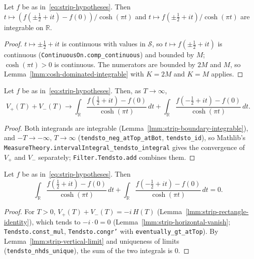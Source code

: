 \begin{lemma}
    \label{lmm:strip-boundary-integrable}
    \leanok
    Let $f$ be as in~\eqref{eq:strip-hypotheses}. Then $t \mapsto (f(\pm\tfrac{1}{2} + it) - f(0))/\cosh(\pi t)$ and $t \mapsto f(\pm\tfrac{1}{2} + it)/\cosh(\pi t)$ are integrable on $\mathbb{R}$.
\end{lemma}
\begin{proof}
    \leanok
    $t \mapsto \pm\tfrac{1}{2} + it$ is continuous with values in $\mathcal{S}$, so $t \mapsto f(\pm\tfrac{1}{2} + it)$ is continuous (\texttt{ContinuousOn.comp\_continuous}) and bounded by $M$; $\cosh(\pi t) > 0$ is continuous. The numerators are bounded by $2M$ and $M$, so Lemma~\ref{lmm:cosh-dominated-integrable} with $K = 2M$ and $K = M$ applies.
\end{proof}

\begin{lemma}
    \label{lmm:strip-vertical-limit}
    \leanok
    Let $f$ be as in~\eqref{eq:strip-hypotheses}. Then, as $T \to \infty$,
    \[ V_+(T) + V_-(T) \to \int_{\mathbb{R}} \frac{f(\tfrac{1}{2} + it) - f(0)}{\cosh(\pi t)} \, dt + \int_{\mathbb{R}} \frac{f(-\tfrac{1}{2} + it) - f(0)}{\cosh(\pi t)} \, dt. \]
\end{lemma}
\begin{proof}
    \leanok
    Both integrands are integrable (Lemma~\ref{lmm:strip-boundary-integrable}), and $-T \to -\infty$, $T \to \infty$ (\texttt{tendsto\_neg\_atTop\_atBot}, \texttt{tendsto\_id}), so Mathlib's \texttt{MeasureTheory.intervalIntegral\_tendsto\_integral} gives the convergence of $V_+$ and $V_-$ separately; \texttt{Filter.Tendsto.add} combines them.
\end{proof}

\begin{lemma}
    \label{lmm:strip-boundary-integral-zero}
    \leanok
    Let $f$ be as in~\eqref{eq:strip-hypotheses}. Then
    \[ \int_{\mathbb{R}} \frac{f(\tfrac{1}{2} + it) - f(0)}{\cosh(\pi t)} \, dt + \int_{\mathbb{R}} \frac{f(-\tfrac{1}{2} + it) - f(0)}{\cosh(\pi t)} \, dt = 0. \]
\end{lemma}
\begin{proof}
    \leanok
    For $T > 0$, $V_+(T) + V_-(T) = -i\,H(T)$ (Lemma~\ref{lmm:strip-rectangle-identity}), which tends to $-i \cdot 0 = 0$ (Lemma~\ref{lmm:strip-horizontal-vanish}; \texttt{Tendsto.const\_mul}, \texttt{Tendsto.congr'} with \texttt{eventually\_gt\_atTop}). By Lemma~\ref{lmm:strip-vertical-limit} and uniqueness of limits (\texttt{tendsto\_nhds\_unique}), the sum of the two integrals is $0$.
\end{proof}

